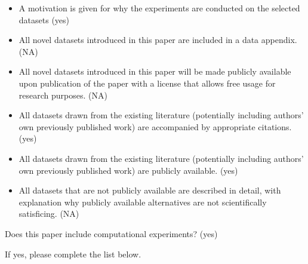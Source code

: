 \begin{itemize} 
\item A motivation is given for why the experiments are conducted on the selected datasets (yes)
\item All novel datasets introduced in this paper are included in a data appendix. (NA)
\item All novel datasets introduced in this paper will be made publicly available upon publication of the paper with a license that allows free usage for research purposes. (NA)
\item All datasets drawn from the existing literature (potentially including authors’ own previously published work) are accompanied by appropriate citations. (yes)
\item All datasets drawn from the existing literature (potentially including authors’ own previously published work) are publicly available. (yes)
\item All datasets that are not publicly available are described in detail, with explanation why publicly available alternatives are not scientifically satisficing. (NA)
\end{itemize}


Does this paper include computational experiments? (yes)

If yes, please complete the list below.

